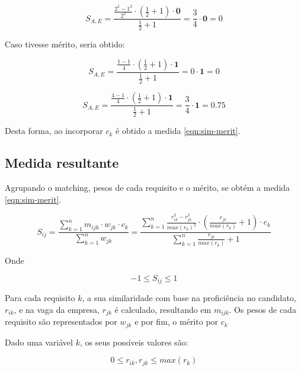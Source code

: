 \documentclass[preprint,12pt]{elsarticle}
\begin{document}
$$ S_{A,E} = \frac{\tfrac{2^2 - 1^2}{2^2} \cdot (\tfrac{1}{2} + 1) \cdot \textbf{0}}
                  {\tfrac{1}{2} + 1}
           = \frac{3}{4} \cdot \textbf{0} = 0 $$

Caso tivesse mérito, seria obtido:

$$ S_{A,E} = \frac{\tfrac{1 - 1}{4} \cdot (\tfrac{1}{2} + 1) \cdot \textbf{1}}
                  {\tfrac{1}{2} + 1}
           = 0 \cdot \textbf{1} = 0 $$

$$ S_{A,E} = \frac{\tfrac{4 - 1}{4} \cdot (\tfrac{1}{2} + 1) \cdot \textbf{1}}
                  {\tfrac{1}{2} + 1}
           = \frac{3}{4} \cdot \textbf{1} = 0.75 $$
           
Desta forma, ao incorporar $c_{k}$ é obtido a medida \ref{eqn:sim-merit}.

\subsection{Medida resultante}

Agrupando o matching, pesos de cada requisito e o mérito, se obtém a medida \ref{eqn:sim-merit}.

\begin{equation}
\label{eqn:sim-merit}
S_{ij} =  \frac{\sum_{k=1}^n m_{ijk} \cdot w_{jk} \cdot c_k}
               {\sum_{k=1}^n w_{jk}} =
          \frac{\sum_{k=1}^n \frac{r_{ik}^2 - r_{jk}^2}{max(r_k)^2} \cdot (\frac{r_{jk}}{max(r_k)} + 1) \cdot c_{k}}
               {\sum_{k=1}^n {\frac{r_{jk}}{max(r_k)} + 1}}
\end{equation}

Onde

\begin{equation}
-1 \leq S_{ij} \leq 1
\end{equation}

Para cada requisito $k$, a sua similaridade com base na proficiência no candidato, $r_{ik}$, e na vaga da empresa, $r_{jk}$ é calculado, resultando em $m_{ijk}$. Os pesos de cada requisito são representados por $w_{jk}$ e por fim, o mérito por $c_k$


Dado uma variável $k$, os seus possíveis valores são:

\begin{equation}
0 \leq r_{ik}, r_{jk} \leq max(r_k)
\end{equation}
\end{document}
